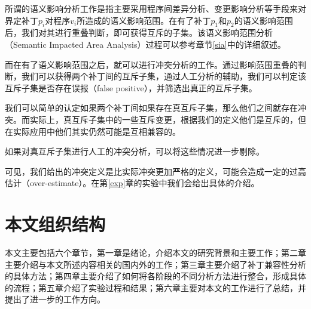 所谓的语义影响分析工作是指主要采用程序间差异分析、变更影响分析等手段来对界定补丁$p_i$对程序$v_i$所造成的语义影响范围。在有了补丁$p_1$和$p_2$的语义影响范围后，我们对其进行重叠判断，即可获得互斥的子集。该语义影响范围分析（Semantic Impacted Area Analysis）过程可以参考章节\ref {sia}中的详细叙述。

而在有了语义影响范围之后，就可以进行冲突分析的工作。通过影响范围重叠的判断，我们可以获得两个补丁间的互斥子集，通过人工分析的辅助，我们可以判定该互斥子集是否存在误报（false positive），并筛选出真正的互斥子集。

我们可以简单的认定如果两个补丁间如果存在真互斥子集，那么他们之间就存在冲突。而实际上，真互斥子集中的一些互斥变更，根据我们的定义他们是互斥的，但在实际应用中他们其实仍然可能是互相兼容的。

如果对真互斥子集进行人工的冲突分析，可以将这些情况进一步剔除。

可见，我们给出的冲突定义是比实际冲突更加严格的定义，可能会造成一定的过高估计（over-estimate）。在第\ref {exp}章的实验中我们会给出具体的介绍。


\section{本文组织结构}

本文主要包括六个章节，第一章是绪论，介绍本文的研究背景和主要工作；第二章主要介绍与本文所述内容相关的国内外的工作；第三章主要介绍了补丁兼容性分析的具体方法；第四章主要介绍了如何将各阶段的不同分析方法进行整合，形成具体的流程；第五章介绍了实验过程和结果；第六章主要对本文的工作进行了总结，并提出了进一步的工作方向。


